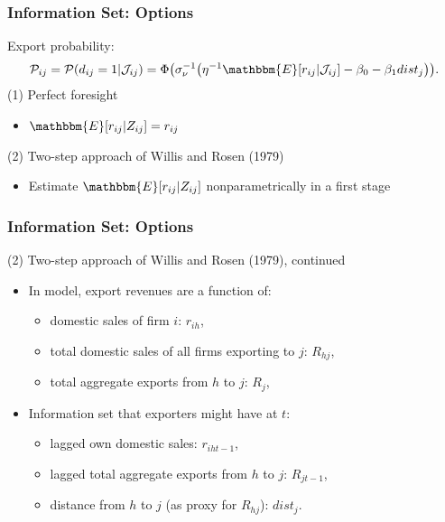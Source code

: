 \begin{frame}
\frametitle{Information Set: Options}
Export probability:
	\begin{align*}
	\mathcal{P}_{ij}=\mathcal{P}(d_{ij}=1|\mathcal{J}_{ij})=\Phi\big(\sigma_{\nu}^{-1}\big(\eta^{-1}\mathbbm{E}[r_{ij}|\mathcal{J}_{ij}]-\beta_{0}-\beta_{1}dist_{j}\big)\big).
	\end{align*}
(1) Perfect foresight
\begin{itemize}
\item $\mathbbm{E}[r_{ij}|Z_{ij}]=r_{ij}$
\end{itemize}
(2) Two-step approach of Willis and Rosen (1979)
\begin{itemize}
\item Estimate $\mathbbm{E}[r_{ij}|Z_{ij}]$ nonparametrically in a first stage 
\end{itemize}
\end{frame}

\begin{frame}
\frametitle{Information Set: Options}

(2) Two-step approach of Willis and Rosen (1979), continued
\begin{itemize}
	\item In model, export revenues are a function of:
	\begin{itemize}
		\item domestic sales of firm $i$: $r_{ih}$,
		\item total domestic sales of all firms exporting to $j$: $R_{hj}$,
		\item total aggregate exports from $h$ to $j$: $R_{j}$,
	\end{itemize}
	\item Information set that exporters might have at $t$:
	\begin{itemize}
		\item lagged own domestic sales: $r_{iht-1}$,
		\item lagged total aggregate exports from $h$ to $j$: $R_{jt-1}$,
		\item distance from $h$ to $j$ (as proxy for $R_{hj}$): $dist_{j}$.
	\end{itemize}
\end{itemize}
\end{frame}


